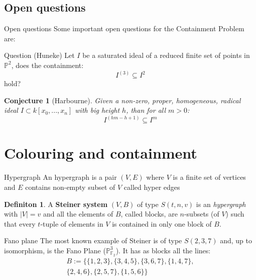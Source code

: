 \documentclass{beamer}
\theoremstyle{plain}
\newtheorem{conj}[teo]{Conjecture}
\theoremstyle{remark}
\theoremstyle{definition}
\newtheorem{deff}[teo]{Definiton}
\newcommand{\PP}{\mathbb{P}}
\newcommand{\cont}[2]{ I^{(#1)} \subseteq I^{#2}}
\begin{document}
\subsection{Open questions}

\begin{frame}{Open questions}
Some important open questions for the Containment Problem are:
\begin{alertblock}{Question (Huneke)}
Let $ I $ be a saturated ideal of a reduced finite set of points in $ \PP^2 $, does the containment:
	\[ \cont{3}{2} \]
hold?
\end{alertblock}
\begin{conj}[Harbourne]\label{conj:harb}
		Given a non-zero, proper, homogeneous, radical ideal $ I \subset k[x_0 , ... , x_n] $ with big height $ h $, than for all $ m > 0 $:
		\[
		\cont{hm - h +1}{m}
		\]
	\end{conj}
\end{frame}

\section{Colouring and containment}

\begin{frame}{Hypergraph}
An hypergraph is a pair $ (V,E) $ where $ V $ is a finite set of vertices and $ E $ contains non-empty subset of $ V $ called hyper edges
\begin{deff}
A \textbf{Steiner system} $ (V,B) $ of type $ S(t,n,v) $ is an \textit{hypergraph} with $ |V|=v $ and all the elements of $ B $, called blocks, are $ n $-subsets (of $ V $) such that every $ t $-tuple of elements in $ V $ is contained in only one block of $ B $.
\end{deff}
\end{frame}

\begin{frame}{Fano plane}
	The most known example of Steiner is of type $ S(2,3,7) $ and, up to isomorphism, is the Fano Plane ($ \PP_{\mathbb{F}_2}^3 $). It has as blocks all the lines:
	\begin{multline*}
		B := \{\{1, 2, 3\}, \{3, 4, 5\}, \{3, 6, 7\}, \{1, 4, 7\}, \\\{2, 4, 6\}, \{2, 5, 7\}, \{1, 5, 6\}\}
	\end{multline*}

\begin{center}
\end{center}


\end{frame}
\end{document}
